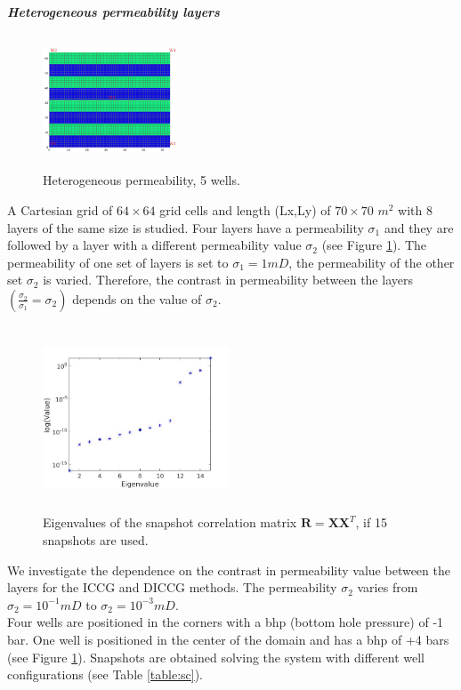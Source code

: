 \documentclass[review]{elsarticle}
\begin{document}
\normalsize
\newpage
\emph{\textbf{Heterogeneous permeability layers}}\\

\begin{figure}
\centering 
\vspace{-10pt}
\includegraphics[width=4cm,height=4cm,keepaspectratio]{images/perm64.jpg}
\caption{ Heterogeneous permeability, 5 wells.}\label{fig:hep_2}
\vspace{-10pt}
\end{figure} 
A Cartesian grid of $64\times64$ grid cells and length (Lx,Ly) of $70\times70$ $m^2$ with 8 layers of the same size is studied. Four layers have a permeability  $\sigma_1$ and they are followed by a layer with a different permeability value $\sigma_2$ (see Figure \ref{fig:hep_2}). The permeability of one set of layers is set to $\sigma_1=1mD$, the permeability of the other set $\sigma_2$ is varied. 
Therefore, the contrast in permeability between the layers $(\frac{\sigma_2}{\sigma_1}=\sigma_2)$
depends on the value of $\sigma_2$.\\
\begin{figure}
\vspace{-10pt}
 \centering
\includegraphics[width=5.5cm,height=5.5cm,keepaspectratio]
{images/eig_pod64.jpg}
\caption{Eigenvalues of the snapshot correlation matrix $\mathbf{R}=\mathbf{X}\mathbf{X}^T$, if 15 snapshots are used.}
\vspace{-5pt}
\label{fig:eig}
\end{figure}
We investigate the dependence on the contrast in permeability value between the layers for the ICCG and DICCG methods.
The permeability  $\sigma_2$ varies from $\sigma_2=10^{-1}mD$ to $\sigma_2=10^{-3}mD$. \\
Four wells are positioned in the corners with a bhp (bottom hole pressure) of -1 bar. One well is positioned in the center of the domain and has a bhp of +4 bars
(see Figure \ref{fig:hep_2}). Snapshots are obtained solving the system with different well
configurations (see Table \ref{table:sc}).
\end{document}
